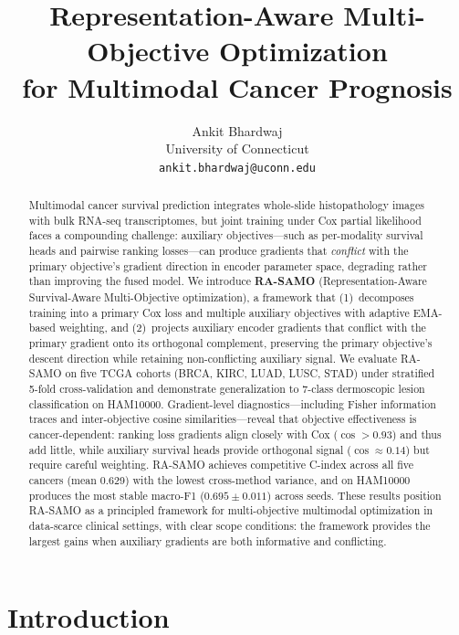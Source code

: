 \documentclass[10pt,twocolumn]{article}
\title{Representation-Aware Multi-Objective Optimization\\for Multimodal Cancer Prognosis}
\author{Ankit Bhardwaj \\
University of Connecticut \\
\texttt{ankit.bhardwaj@uconn.edu}}
\date{}
\begin{document}
\maketitle

\begin{abstract}
Multimodal cancer survival prediction integrates whole-slide
histopathology images with bulk RNA-seq transcriptomes, but joint
training under Cox partial likelihood faces a compounding challenge:
auxiliary objectives---such as per-modality survival heads and pairwise
ranking losses---can produce gradients that \textit{conflict} with the
primary objective's gradient direction in encoder parameter space,
degrading rather than improving the fused model. We introduce
\textbf{RA-SAMO} (Representation-Aware Survival-Aware Multi-Objective
optimization), a framework that (1)~decomposes training into a primary
Cox loss and multiple auxiliary objectives with adaptive EMA-based
weighting, and (2)~projects auxiliary encoder gradients that conflict
with the primary gradient onto its orthogonal complement, preserving
the primary objective's descent direction while retaining
non-conflicting auxiliary signal. We evaluate RA-SAMO on five TCGA
cohorts (BRCA, KIRC, LUAD, LUSC, STAD) under stratified 5-fold
cross-validation and demonstrate generalization to 7-class
dermoscopic lesion classification on HAM10000. Gradient-level
diagnostics---including Fisher information traces and inter-objective
cosine similarities---reveal that objective effectiveness is
cancer-dependent: ranking loss gradients align closely with Cox
($\cos > 0.93$) and thus add little, while auxiliary survival heads
provide orthogonal signal ($\cos \approx 0.14$) but require careful
weighting. RA-SAMO achieves competitive C-index across all five
cancers (mean 0.629) with the lowest cross-method variance, and on
HAM10000 produces the most stable macro-F1 ($0.695 \pm 0.011$) across
seeds. These results position RA-SAMO as a principled framework for
multi-objective multimodal optimization in data-scarce clinical settings,
with clear scope conditions: the framework provides the largest gains
when auxiliary gradients are both informative and conflicting.
\end{abstract}


\section{Introduction}
\end{document}
